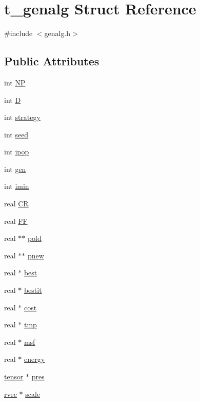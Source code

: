 \hypertarget{structt__genalg}{\section{t\-\_\-genalg \-Struct \-Reference}
\label{structt__genalg}
}


{\ttfamily \#include $<$genalg.\-h$>$}

\subsection*{\-Public \-Attributes}
\begin{DoxyCompactItemize}
\item 
int \hyperlink{structt__genalg_af621b4ee65d1226812e9667503d11f95}{\-N\-P}
\item 
int \hyperlink{structt__genalg_a076e7a97126055e41702ec2cb079220c}{\-D}
\item 
int \hyperlink{structt__genalg_ae3ba6ad516ee6c3db059bb3cc6483f89}{strategy}
\item 
int \hyperlink{structt__genalg_ad57b3ba173cb1cec587df522252b889c}{seed}
\item 
int \hyperlink{structt__genalg_a2c3fefd7e063dfc3dbf53092dfaab5b0}{ipop}
\item 
int \hyperlink{structt__genalg_a9d19a7e64a36fa51cb79ef4fccb34171}{gen}
\item 
int \hyperlink{structt__genalg_af0cf94b367b07cc17cea450f69a21225}{imin}
\item 
real \hyperlink{structt__genalg_a299c39ff23af85c2a5b20faa254a089e}{\-C\-R}
\item 
real \hyperlink{structt__genalg_a8ef4e7e1ea8dacc6347d673d95787504}{\-F\-F}
\item 
real $\ast$$\ast$ \hyperlink{structt__genalg_af5c6e13093e645bf8f43569055c89ad2}{pold}
\item 
real $\ast$$\ast$ \hyperlink{structt__genalg_a12a7752fce30468d6f4b8b6c756089c3}{pnew}
\item 
real $\ast$ \hyperlink{structt__genalg_a6a403b49cfea47163188629017873827}{best}
\item 
real $\ast$ \hyperlink{structt__genalg_afe342c720f3cf3e244d25cf3a35f6921}{bestit}
\item 
real $\ast$ \hyperlink{structt__genalg_af62f1fb99b26ac7c1d3544dd02e07e22}{cost}
\item 
real $\ast$ \hyperlink{structt__genalg_a132ad6d9b56931a5ee331b923141c5c6}{tmp}
\item 
real $\ast$ \hyperlink{structt__genalg_a1050a1f347bd6f2d938314ff66d831ff}{msf}
\item 
real $\ast$ \hyperlink{structt__genalg_a493d88b35f28842f3493f7842437a4ab}{energy}
\item 
\hyperlink{share_2template_2gromacs_2types_2simple_8h_aef0bf341f56ce75f09dbb64350488a61}{tensor} $\ast$ \hyperlink{structt__genalg_ae7ea2197e044a7918c90a0b7f880fe3a}{pres}
\item 
\hyperlink{share_2template_2gromacs_2types_2simple_8h_aa02a552a4abd2f180c282a083dc3a999}{rvec} $\ast$ \hyperlink{structt__genalg_a387884bd42ef81b390290e2216c29762}{scale}
\end{DoxyCompactItemize}


